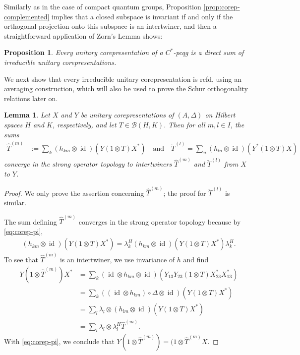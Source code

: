 \documentclass[11pt]{article}
\DeclareMathOperator{\id}{id}
\newtheorem{Lem}[Theorem]{Lemma}
\newtheorem{Prop}[Theorem]{Proposition}
\theoremstyle{definition}
\numberwithin{equation}{section}
\begin{document}
Similarly as in the case of compact quantum groups, Proposition \ref{prop:corep-complemented} implies
that a closed subspace is invariant if and only if the orthogonal
projection onto this subspace is an intertwiner, and then a
straightforward application of Zorn's Lemma shows:
\begin{Prop} \label{prop:corep-decompose}
  Every unitary corepresentation of a $C^{*}$-pcqg is a direct sum of
  irreducible unitary corepresentations.
\end{Prop}
We next show that every irreducible unitary corepresentation
is rcfd, using an averaging construction, which
will also be used to prove the Schur orthogonality relations later on.
\begin{Lem} \label{lem:intertwiner-averaged}
  Let $X$ and $Y$ be unitary corepresentations of $(A,\Delta)$ on Hilbert spaces $H$ and $K$,
  respectively, and let $T \in \mathcal{B}(H,K)$. Then for all $m,l \in I$, the sums
  \begin{align*}
    \hat T^{(m)} &:= \sum_{k} (h_{km} \otimes \id)(Y(1 \otimes T)X^{*}) \quad \text{and} \quad
    \check T^{(l)}=\sum_{n} (h_{ln}\otimes \id)(Y^{*}(1 \otimes T)X)
  \end{align*}
  converge in the strong operator topology to intertwiners $\hat
  T^{(m)}$ and $\check T^{(l)}$ from $X$ to $Y$.
\end{Lem}
\begin{proof}
  We only prove the assertion concerning $\hat T^{(m)}$; the proof for $\check T^{(l)}$ is similar.
  
  The sum defining $\hat T^{(m)}$ converges in the strong operator topology because by
  \eqref{eq:corep-pi},
  \begin{align*}
    (h_{km} \otimes \id)(Y(1 \otimes T)X^{*}) = \lambda^{H}_{k}
    (h_{km} \otimes \id)(Y(1 \otimes T)X^{*}) \lambda^{H}_{k}.
  \end{align*}
  To see that $\hat T^{(m)}$ is an intertwiner, we use invariance of $h$ and find
  \begin{align*}
    Y(1 \otimes \hat T^{(m)})X^{*} &=
    \sum_{k} (\id \otimes h_{km} \otimes \id)(Y_{13}Y_{23}(1 \otimes T)X^{*}_{23}X^{*}_{13}) \\
    &= \sum_{k} ((\id \otimes h_{km})\circ \Delta \otimes \id)(Y(1 \otimes T)X^{*}) \\
    &=\sum_{l} \lambda_{l} \otimes (h_{lm} \otimes \id)(Y(1\otimes T)X^{*}) \\
    &= \sum_{l} \lambda_{l}   \otimes \lambda^{H}_{l} \hat T^{(m)}.
  \end{align*}
  With \eqref{eq:corep-pi}, we conclude that $Y(1\otimes \hat T^{(m)})
  = (1 \otimes \hat T^{(m)}X$.
\end{proof} 
\end{document}
